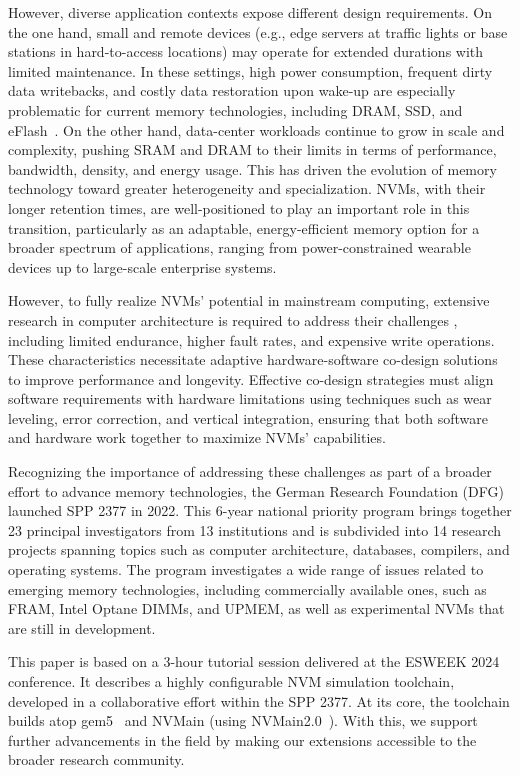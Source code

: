 \documentclass[manuscript,screen]{acmart}
\begin{document}
However, diverse application contexts expose different design requirements.
On the one hand, small and remote devices (e.g., edge servers at traffic lights or base stations in hard-to-access locations) may operate for extended durations with limited maintenance. In these settings, high power consumption, frequent dirty data writebacks, and costly data restoration upon wake-up are especially problematic for current memory technologies, including DRAM, SSD, and eFlash~\cite{8351201}.
On the other hand, data-center workloads continue to grow in scale and complexity, pushing SRAM and DRAM to their limits in terms of performance, bandwidth, density, and energy usage. 
This has driven the evolution of memory technology toward greater heterogeneity and specialization.
NVMs, with their longer retention times, are well-positioned to play an important role in this transition, particularly as an adaptable, energy-efficient memory option for a broader spectrum of applications, ranging from power-constrained wearable devices up to large-scale enterprise systems.


However, to fully realize NVMs' potential in mainstream computing, extensive research in computer architecture is required to address their challenges
, including limited endurance, higher fault rates, and expensive write operations.
These characteristics necessitate adaptive hardware-software co-design solutions to improve performance and longevity.
Effective co-design strategies must align software requirements with hardware limitations using techniques such as wear leveling, error correction, and vertical integration, ensuring that both software and hardware work together to maximize NVMs' capabilities.

Recognizing the importance of addressing these challenges as part of a broader effort to advance memory technologies, the German Research Foundation (DFG) launched SPP 2377 in 2022.
This 6-year national priority program brings together 23 principal investigators from 13 institutions and is subdivided into 14 research projects spanning topics such as computer architecture, databases, compilers, and operating systems.
The program investigates a wide range of issues related to emerging memory technologies, including commercially available ones, such as FRAM, Intel Optane DIMMs, and UPMEM\cite{devaux2019true}, as well as experimental NVMs that are still in development.


This paper is based on a 3-hour tutorial session delivered at the ESWEEK 2024 conference. 
It describes 
a highly configurable NVM simulation toolchain, developed in a collaborative effort within the SPP 2377. 
At its core, the toolchain builds atop gem5~\cite{binkert:2011} and NVMain (using NVMain2.0~\cite{poremba:2015}). 
With this, we support further advancements in the field by making our extensions accessible to the broader research community.
\end{document}

